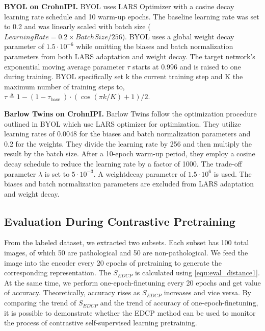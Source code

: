 \documentclass[conference]{IEEEtran}
\begin{document}
\textbf{BYOL on CrohnIPI.}
BYOL uses LARS Optimizer\cite{LARS_you2017scaling} with a cosine decay learning rate schedule and 10 warm-up epochs. The baseline learning rate was set to 0.2 and was linearly scaled\cite{LR_linear_scaledgoyal2017accurate} with batch size ($LearningRate =0.2 \times BatchSize / 256$). BYOL uses a global weight decay parameter of $1.5 \cdot 10^{-6}$ while omitting the biases and batch normalization parameters from both LARS adaptation and weight decay. The target network's exponential moving average parameter $\tau$ starts at 0.996 and is raised to one during training. BYOL specifically set k the current training step and K the maximum number of training steps to, $\tau \triangleq 1-\left(1-\tau_{\text {base }}\right) \cdot(\cos (\pi k / K)+1) / 2$.

\textbf{Barlow Twins on CrohnIPI.}
Barlow Twins follow the optimization procedure outlined in BYOL\cite{BYOL} which use LARS optimizer for optimization. They utilize learning rates of 0.0048 for the biases and batch normalization parameters and 0.2 for the weights. They divide the learning rate by 256 and then multiply the result by the batch size. After a 10-epoch warm-up period, they employ a cosine decay schedule to reduce the learning rate by a factor of 1000\cite{warmup_loshchilov2016sgdr}. The trade-off parameter $\lambda$ is set to $5 \cdot 10^{-3}$. A weightdecay parameter of $1.5 \cdot 10^{6}$ is used. The biases and batch normalization parameters are excluded from LARS adaptation and weight decay.

\subsection{Evaluation During Contrastive Pretraining}
From the labeled dataset, we extracted two subsets. Each subset has 100 total images, of which 50 are pathological and 50 are non-pathological. We feed the image into the encoder every 20 epochs of pretraining to generate the corresponding representation. The $S_{EDCP}$ is calculated using \eqref{equ:eval_distance1}. At the same time, we perform one-epoch-finetuning every 20 epochs and get value of accuracy. Theoretically, accuracy rises as $S_{EDCP}$ increases and vice versa.
By comparing the trend of $S_{EDCP}$ and the trend of accuracy of one-epoch-finetuning, it is possible to demonstrate whether the EDCP method can be used to monitor the process of contrastive self-supervised learning pretraining.
\end{document}
